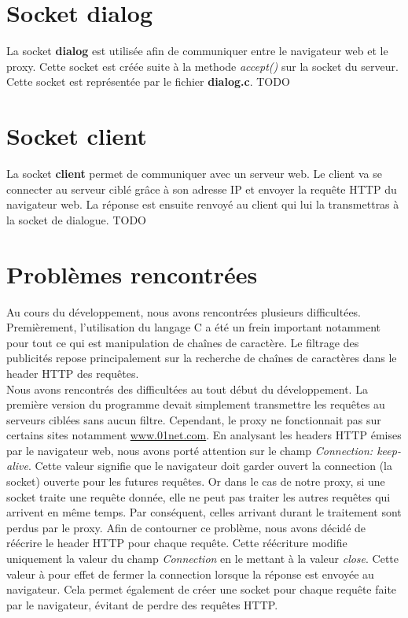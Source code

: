 \documentclass[a4paper,11pt, oneside]{book}
\def\todo{{\color{red}\Huge{TODO}}}
\begin{document}
		\section{Socket dialog}

			La socket \textbf{dialog} est utilisée afin de communiquer entre le navigateur web et le proxy. Cette socket est créée
			suite à la methode \textit{accept()} sur la socket du serveur. Cette socket est représentée par le fichier \textbf{dialog.c}.
			\todo

		\section{Socket client}

			La socket \textbf{client} permet de communiquer avec un serveur web. Le client va se connecter au serveur ciblé grâce à son adresse IP
			et envoyer la requête HTTP du navigateur web. La réponse est ensuite renvoyé au client qui lui la transmettras à la socket de dialogue.
			\todo

		\section{Problèmes rencontrées}

			Au cours du développement, nous avons rencontrées plusieurs difficultées.
			Premièrement, l'utilisation du langage C a été un frein important notamment pour tout ce qui est
			manipulation de chaînes de caractère.
			Le filtrage des publicités repose principalement sur la recherche de chaînes de caractères dans le header HTTP des requêtes.\\

			\noindent Nous avons rencontrés des difficultées au tout début du développement.
			La première version du programme devait simplement transmettre les requêtes au serveurs ciblées sans aucun filtre.
			Cependant, le proxy ne fonctionnait pas sur certains sites notamment \href{http://www.01net.com}{www.01net.com}.
			En analysant les headers HTTP émises par le navigateur web, nous avons porté attention sur le champ
			\textit{Connection: keep-alive}. Cette valeur signifie que le navigateur doit garder ouvert la connection (la socket) ouverte
			pour les futures requêtes. Or dans le cas de notre proxy, si une socket traite une requête donnée, elle ne peut
			pas traiter les autres requêtes qui arrivent en même temps. Par conséquent, celles arrivant durant le traitement sont perdus par
			le proxy. Afin de contourner ce problème,
			nous avons décidé de réécrire le header HTTP pour chaque requête. Cette réécriture
			modifie uniquement la valeur du champ \textit{Connection} en le mettant à la valeur \textit{close}.
			Cette valeur à pour effet de fermer la connection lorsque la réponse est envoyée au navigateur. Cela permet
			également de créer une socket pour chaque requête faite par le navigateur, évitant de perdre des requêtes HTTP.
\end{document}
